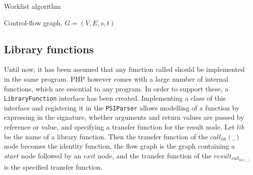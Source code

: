 \begin{algorithm}
\caption{Worklist algorithm}
\label{algo:worklist}
\begin{algorithmic}[1]
\scriptsize
\Require Control-flow graph, $G=(V,E,s,t)$
	
		
		
	\EndIf
	
\EndWhile
\end{algorithmic}
\end{algorithm}

\newpage
\subsection{Library functions}
\label{subsec:libraryFunctions}
Until now, it has been assumed that any function called should be implemented in the same program. PHP however comes with a large number of internal functions, which are essential to any program. In order to support these, a \texttt{LibraryFunction} interface has been created. Implementing a class of this interface and registering it in the \texttt{PSIParser} allows modelling of a function by expressing in the signature, whether arguments and return values are passed by reference or value, and specifying a transfer function for the result node. Let $\mathit{lib}$ be the name of a library function. Then the transfer function of the $\mathit{call}_\mathit{lib}(\_)$ node becomes the identity function, the flow graph is the graph containing a $\mathit{start}$ node followed by an $\mathit{exit}$ node, and the transfer function of the $\mathit{result}_{\mathit{call}_{\mathit{lib}(\_)}}$ is the specified transfer function. 

